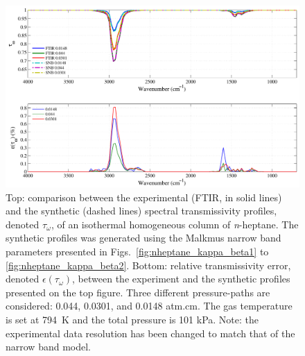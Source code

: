 \begin{figure}[p]
\includegraphics[width=\textwidth]{Figures/Comparison_Fit_Heptane_MALKMUS_Temp794K.pdf}
\caption{Top: comparison between the experimental (FTIR, in solid lines) and the synthetic (dashed lines) spectral transmissivity profiles, denoted $\tau_{\omega}$, of an isothermal homogeneous column of \textit{n}-heptane. The synthetic profiles was generated using the Malkmus narrow band parameters presented in Figs.~\ref{fig:nheptane_kappa_beta1} to \ref{fig:nheptane_kappa_beta2}. Bottom: relative transmissivity error, denoted $\epsilon{(\tau_{\omega})}$, between the experiment and the synthetic profiles presented on the top figure. Three different pressure-paths are considered: 0.044, 0.0301, and 0.0148 atm.cm. The gas temperature is set at 794~K and the total pressure is 101 kPa. Note: the experimental data resolution has been changed to match that of the narrow band model. \label{fig:nheptane_SNBVerify_794K}}
\end{figure}

